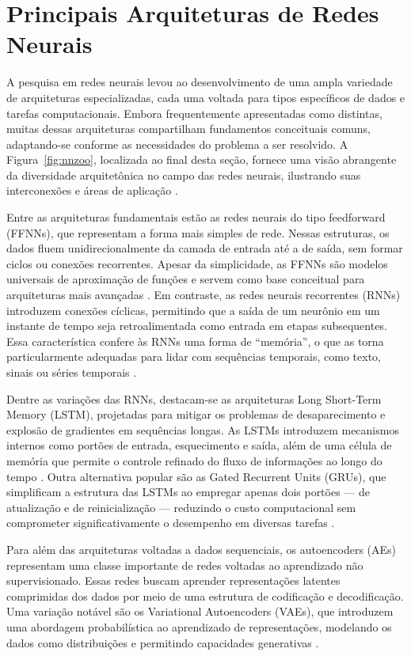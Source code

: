 \section{Principais Arquiteturas de Redes Neurais}

 A pesquisa em redes neurais levou ao desenvolvimento de uma ampla variedade de arquiteturas especializadas, cada uma voltada para tipos específicos de dados e tarefas computacionais. Embora frequentemente apresentadas como distintas, muitas dessas arquiteturas compartilham fundamentos conceituais comuns, adaptando-se conforme as necessidades do problema a ser resolvido. A Figura~\ref{fig:nnzoo}, localizada ao final desta seção,  fornece uma visão abrangente da diversidade arquitetônica no campo das redes neurais, ilustrando suas interconexões e áreas de aplicação .

Entre as arquiteturas fundamentais estão as redes neurais do tipo feedforward (FFNNs), que representam a forma mais simples de rede. Nessas estruturas, os dados fluem unidirecionalmente da camada de entrada até a de saída, sem formar ciclos ou conexões recorrentes. Apesar da simplicidade, as FFNNs são modelos universais de aproximação de funções e servem como base conceitual para arquiteturas mais avançadas . Em contraste, as redes neurais recorrentes (RNNs) introduzem conexões cíclicas, permitindo que a saída de um neurônio em um instante de tempo seja retroalimentada como entrada em etapas subsequentes. Essa característica confere às RNNs uma forma de “memória”, o que as torna particularmente adequadas para lidar com sequências temporais, como texto, sinais ou séries temporais .

Dentre as variações das RNNs, destacam-se as arquiteturas Long Short-Term Memory (LSTM), projetadas para mitigar os problemas de desaparecimento e explosão de gradientes em sequências longas. As LSTMs introduzem mecanismos internos como portões de entrada, esquecimento e saída, além de uma célula de memória que permite o controle refinado do fluxo de informações ao longo do tempo . Outra alternativa popular são as Gated Recurrent Units (GRUs), que simplificam a estrutura das LSTMs ao empregar apenas dois portões — de atualização e de reinicialização — reduzindo o custo computacional sem comprometer significativamente o desempenho em diversas tarefas .

Para além das arquiteturas voltadas a dados sequenciais, os autoencoders (AEs) representam uma classe importante de redes voltadas ao aprendizado não supervisionado. Essas redes buscam aprender representações latentes comprimidas dos dados por meio de uma estrutura de codificação e decodificação. Uma variação notável são os Variational Autoencoders (VAEs), que introduzem uma abordagem probabilística ao aprendizado de representações, modelando os dados como distribuições e permitindo capacidades generativas .

